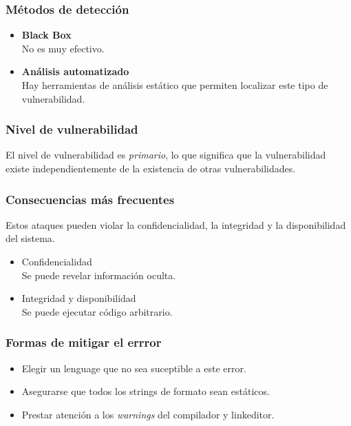 \subsubsection{Métodos de detección}
\begin{itemize}
 \item \textbf{Black Box}\\
 	No es muy efectivo.
  \item \textbf{Análisis automatizado}\\
  	Hay herramientas de análisis estático que permiten localizar este tipo de vulnerabilidad.
\end{itemize}

\subsubsection{Nivel de vulnerabilidad}

El nivel de vulnerabilidad es \textit{primario}, lo que significa que la vulnerabilidad existe independientemente de la existencia de otras vulnerabilidades.

\subsubsection{Consecuencias más frecuentes}

Estos ataques pueden violar la confidencialidad, la integridad y la disponibilidad del sistema.

\begin{itemize}
 \item Confidencialidad\\
    Se puede revelar información oculta.
 \item Integridad y disponibilidad\\
    Se puede ejecutar código arbitrario.
\end{itemize}

\subsubsection{Formas de mitigar el errror}

\begin{itemize}

	\item Elegir un lenguage que no sea suceptible a este error.

	\item Asegurarse que todos los strings de formato sean estáticos.

	\item Prestar atención a los \textit{warnings} del compilador y linkeditor.

\end{itemize}

